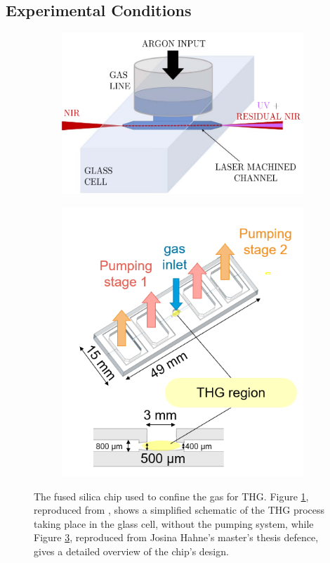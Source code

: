 \documentclass[a4paper]{jpconf}
\begin{document}
\subsection{Experimental Conditions}\label{sec:exp_cond} 
\begin{figure}[h]
\centering
 \begin{subfigure}{0.5\textwidth}
        \includegraphics[width=\textwidth]{im/schematic_galli}
   \caption{}\label{im:thg_schematic}
    \end{subfigure}  
 \begin{subfigure}{0.5\textwidth}
        \includegraphics[width=\textwidth]{im/new_chip_edited}
    \caption{}\label{im:new_chip}
    \end{subfigure}
\caption{The fused silica chip used to confine the gas for THG. 
Figure \ref{im:thg_schematic}, reproduced from \cite{galli2019}, shows a simplified schematic of the THG process taking place in the glass cell, without the pumping system, while Figure \ref{im:new_chip}, reproduced from Josina Hahne's master's thesis defence, gives a detailed overview of the chip's design.}
\end{figure}
\end{document}
